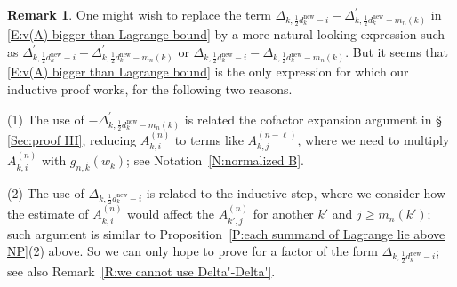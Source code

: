 \documentclass[12pt]{amsart}
\theoremstyle{definition}
\newtheorem{remark}[subsection]{Remark}
\numberwithin{equation}{subsection}
\newcommand{\new}{\mathrm{new}}
\begin{document}
\begin{remark}\label{R:comment on the estimate Delta-Delta'}
One might wish to replace the term $\Delta_{k,\frac 12 d_{k}^\new -i} - \Delta^{\prime}_{k, \frac 12 d_{k}^\mathrm{new}- m_n(k)}$ in \eqref{E:v(A) bigger than Lagrange bound} by a more natural-looking expression such as  $\Delta^{\prime}_{k,\frac 12 d_{k}^\new -i} - \Delta^{\prime}_{k, \frac 12 d_{k}^\mathrm{new}- m_n(k)}$ or $\Delta_{k,\frac 12 d_{k}^\new -i} - \Delta_{k, \frac 12 d_{k}^\mathrm{new}- m_n(k)}$.
But it seems that \eqref{E:v(A) bigger than Lagrange bound} is the only expression for which our inductive proof works, for the following two reasons. 

(1) The use of $-\Delta^{\prime}_{k, \frac 12 d_{k}^\mathrm{new}- m_n(k)}$ is related the cofactor expansion argument in \S\,\ref{Sec:proof III}, reducing $A_{k,i}^{(n)}$ to terms like $A_{k,j}^{(n-\ell)}$, where we need to multiply $A_{k,i}^{(n)}$ with $g_{n,\hat k}(w_k)$; see Notation~\ref{N:normalized B}. 

(2) The use of $\Delta_{k, \frac 12 d_{k}^\mathrm{new}- i}$ is related to the inductive step, where we consider how the estimate of $A_{k,i}^{(n)}$ would affect the $A_{k',j}^{(n)}$ for another $k'$ and $j\geq m_n(k')$; such argument is similar to Proposition~\ref{P:each summand of Lagrange lie above NP}(2) above. So we can only hope to prove for a factor of the form $\Delta_{k, \frac 12 d_{k}^\mathrm{new}- i}$; see also Remark~\ref{R:we cannot use Delta'-Delta'}.
\end{remark}
\end{document}
